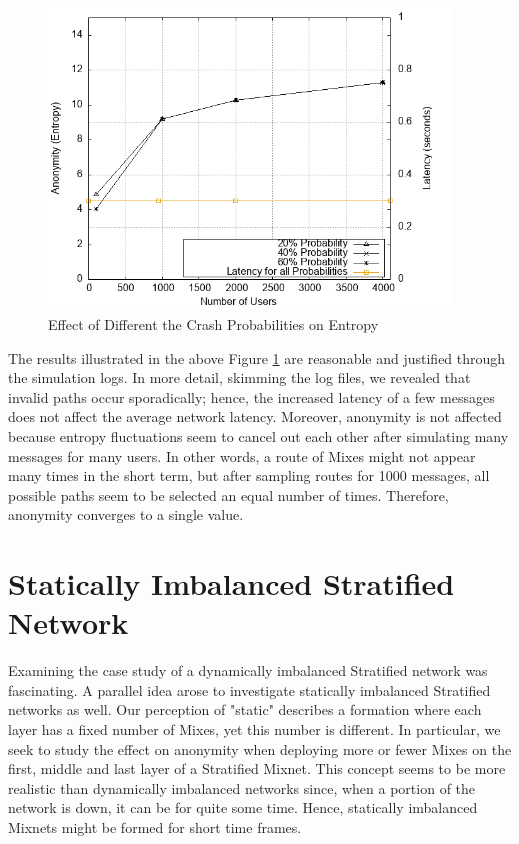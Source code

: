 \documentclass[logo,msc,cyber]{infthesis}   %
\begin{document}
\begin{figure}[h!]
    \centering
    \includegraphics[height=8cm]{figures/simulator_extentions/mix_failure.png}
    \caption{Effect of Different the Crash Probabilities on Entropy}
    \label{fig:dynamic-crash-probability}
\end{figure}    


The results illustrated in the above Figure \ref{fig:dynamic-crash-probability}
are reasonable and justified through the simulation logs. In more detail,
skimming the log files, we revealed that invalid paths occur sporadically; hence,
the increased latency of a few messages does not affect the average network
latency. Moreover, anonymity is not affected because entropy fluctuations seem
to cancel out each other after simulating many messages for many users. In other
words, a route of Mixes might not appear many times in the short term, but after
sampling routes for 1000 messages, all possible paths seem to be selected an
equal number of times. Therefore, anonymity converges to a single value.

\section{Statically Imbalanced Stratified Network}

Examining the case study of a dynamically imbalanced Stratified network was
fascinating. A parallel idea arose to investigate statically imbalanced
Stratified networks as well. Our perception of "static" describes a formation
where each layer has a fixed number of Mixes, yet this number is different. In
particular, we seek to study the effect on anonymity when deploying more or
fewer Mixes on the first, middle and last layer of a Stratified Mixnet. This
concept seems to be more realistic than dynamically imbalanced networks since,
when a portion of the network is down, it can be for quite some time. Hence,
statically imbalanced Mixnets might be formed for short time frames.
\end{document}
